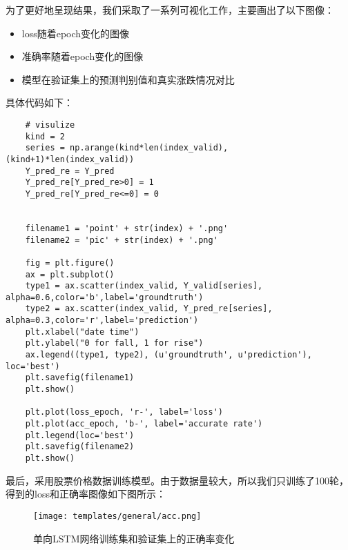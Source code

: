 \documentclass[addpoints,answers]{exam}
\begin{document}
为了更好地呈现结果，我们采取了一系列可视化工作，主要画出了以下图像：
\begin{itemize}
    \item loss随着epoch变化的图像
    \item 准确率随着epoch变化的图像
    \item 模型在验证集上的预测判别值和真实涨跌情况对比
\end{itemize}
具体代码如下：
\begin{lstlisting}
    # visulize
    kind = 2
    series = np.arange(kind*len(index_valid),(kind+1)*len(index_valid))
    Y_pred_re = Y_pred
    Y_pred_re[Y_pred_re>0] = 1
    Y_pred_re[Y_pred_re<=0] = 0

    
    filename1 = 'point' + str(index) + '.png'
    filename2 = 'pic' + str(index) + '.png'
    
    fig = plt.figure()
    ax = plt.subplot()
    type1 = ax.scatter(index_valid, Y_valid[series], alpha=0.6,color='b',label='groundtruth') 
    type2 = ax.scatter(index_valid, Y_pred_re[series], alpha=0.3,color='r',label='prediction') 
    plt.xlabel("date time")
    plt.ylabel("0 for fall, 1 for rise")
    ax.legend((type1, type2), (u'groundtruth', u'prediction'), loc='best')
    plt.savefig(filename1)
    plt.show()

    plt.plot(loss_epoch, 'r-', label='loss')
    plt.plot(acc_epoch, 'b-', label='accurate rate')
    plt.legend(loc='best')
    plt.savefig(filename2)
    plt.show()

\end{lstlisting}
最后，采用股票价格数据训练模型。由于数据量较大，所以我们只训练了100轮，得到的loss和正确率图像如下图所示：

\begin{figure}[H] %
\centering %
\texttt{[image: templates/general/acc.png]} %
\caption{单向LSTM网络训练集和验证集上的正确率变化} %
\label{Fig.main3} %
\end{figure}
\end{document}
